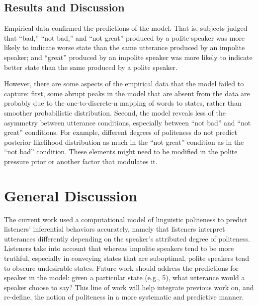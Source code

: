 \documentclass[10pt,letterpaper]{article}
\begin{document}
\subsection{Results and Discussion}

Empirical data confirmed the predictions of the model. That is, subjects judged that ``bad,'' ``not bad,'' and ``not great'' produced by a polite speaker was more likely to indicate worse state than the same utterance produced by an impolite speaker; and ``great'' produced by an impolite speaker was more likely to indicate better state than the same produced by a polite speaker. 

However, there are some aspects of the empirical data that the model failed to capture: first, some abrupt peaks in the model that are absent from the data are probably due to the one-to-discrete-n mapping of words to states, rather than smoother probabilistic distribution. Second, the model reveals less of the asymmetry between utterance conditions, especially between ``not bad'' and ``not great'' conditions. For example, different degrees of politeness do not predict posterior likelihood distribution as much in the ``not great'' condition as in the ``not bad'' condition. These elements might need to be modified in the polite pressure prior or another factor that modulates it. 

\section{General Discussion}

The current work used a computational model of linguistic politeness to predict listeners' inferential behaviors accurately, namely that listeners interpret utterances differently depending on the speaker's attributed degree of politeness. Listeners take into account that whereas impolite speakers tend to be more truthful, especially in conveying states that are suboptimal, polite speakers tend to obscure undesirable states. Future work should address the predictions for speaker in the model: given a particular state (e.g., 5), what utterance would a speaker choose to say? This line of work will help integrate previous work on, and re-define, the notion of politeness in a more systematic and predictive manner.



\setlength{\bibleftmargin}{.125in}
\setlength{\bibindent}{-\bibleftmargin}


\end{document}
